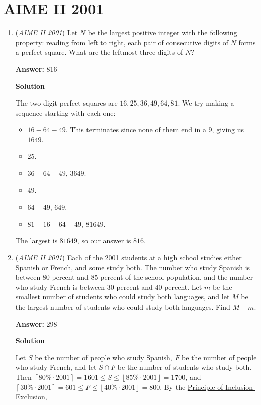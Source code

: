 \section{AIME II 2001}
        \begin{enumerate}
        	\item (\textit{AIME II 2001}) Let $N$ be the largest positive integer with the following property: reading from left to right, each pair of consecutive digits of $N$ forms a perfect square. What are the leftmost three digits of $N$?


 
 \textbf{Answer: }816



\textbf{Solution}

The two-digit perfect squares are $16, 25, 36, 49, 64, 81$. We try making a sequence starting with each one:

 
            \begin{itemize}
        \item $16 - 64 - 49$. This terminates since none of them end in a $9$, giving us $1649$.
        \item $25$.
        \item $36 - 64 - 49$, $3649$.
        \item $49$.
        \item $64 - 49$, $649$.
        \item $81 - 16 - 64 - 49$, $81649$.
            \end{itemize}
            The largest is $81649$, so our answer is $\boxed{816}$.

 


	\item (\textit{AIME II 2001}) Each of the 2001 students at a high school studies either Spanish or French, and some study both. The number who study Spanish is between 80 percent and 85 percent of the school population, and the number who study French is between 30 percent and 40 percent. Let $m$ be the smallest number of students who could study both languages, and let $M$ be the largest number of students who could study both languages. Find $M-m$. 


 
 \textbf{Answer: }298



\textbf{Solution}

Let $S$ be the number of people who study Spanish, $F$ be the number of people who study French, and let $S \cap F$ be the number of students who study both. Then $\left\lceil 80\% \cdot 2001 \right\rceil = 1601 \le S \le \left\lfloor 85\% \cdot 2001 \right\rfloor = 1700$, and $\left\lceil 30\% \cdot 2001 \right\rceil = 601 \le F \le \left\lfloor 40\% \cdot 2001 \right\rfloor = 800$. By the \href{https://artofproblemsolving.com/wiki/index.php?title=Principle\_of\_Inclusion-Exclusion}{Principle of Inclusion-Exclusion},


\end{enumerate}
